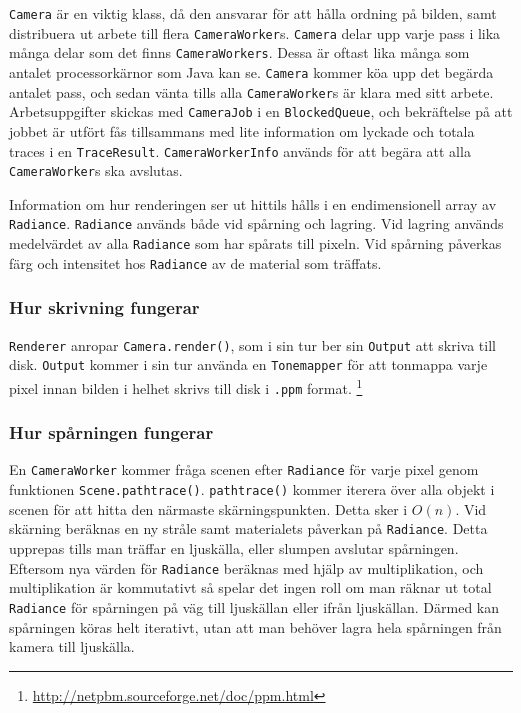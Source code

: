 \documentclass{article}
\begin{document}
\texttt{Camera} är en viktig klass, då den ansvarar för att hålla
ordning på bilden, samt distribuera ut arbete till flera
\texttt{CameraWorker}s. \texttt{Camera} delar upp varje pass i lika
många delar som det finns \texttt{CameraWorkers}. Dessa är oftast lika
många som antalet processorkärnor som Java kan se. \texttt{Camera}
kommer köa upp det begärda antalet pass, och sedan vänta tills alla
\texttt{CameraWorker}s är klara med sitt arbete. Arbetsuppgifter
skickas med \texttt{CameraJob} i en \texttt{BlockedQueue}, och
bekräftelse på att jobbet är utfört fås tillsammans med lite
information om lyckade och totala traces i en
\texttt{TraceResult}. \texttt{CameraWorkerInfo} används för att begära
att alla \texttt{CameraWorker}s ska avslutas.

Information om hur renderingen ser ut hittils hålls i en
endimensionell array av \texttt{Radiance}. \texttt{Radiance} används
både vid spårning och lagring. Vid lagring används medelvärdet av alla
\texttt{Radiance} som har spårats till pixeln. Vid spårning påverkas
färg och intensitet hos \texttt{Radiance} av de material som träffats.

\subsubsection{Hur skrivning fungerar}
\texttt{Renderer} anropar \texttt{Camera.render()}, som i sin tur ber
sin \texttt{Output} att skriva till disk. \texttt{Output} kommer i sin
tur använda en \texttt{Tonemapper} för att tonmappa varje pixel innan
bilden i helhet skrivs till disk i \texttt{.ppm} format.
\footnote{\url{http://netpbm.sourceforge.net/doc/ppm.html}}

\subsubsection{Hur spårningen fungerar}
En \texttt{CameraWorker} kommer fråga scenen efter \texttt{Radiance}
för varje pixel genom funktionen
\texttt{Scene.pathtrace()}. \texttt{pathtrace()} kommer iterera över
alla objekt i scenen för att hitta den närmaste
skärningspunkten. Detta sker i $O(n)$. Vid skärning beräknas en ny
stråle samt materialets påverkan på \texttt{Radiance}. Detta upprepas
tills man träffar en ljuskälla, eller slumpen avslutar spårningen.
Eftersom nya värden för \texttt{Radiance} beräknas med hjälp av
multiplikation, och multiplikation är kommutativt så spelar det ingen
roll om man räknar ut total \texttt{Radiance} för spårningen på väg
till ljuskällan eller ifrån ljuskällan. Därmed kan spårningen köras
helt iterativt, utan att man behöver lagra hela spårningen från kamera
till ljuskälla.
\end{document}
